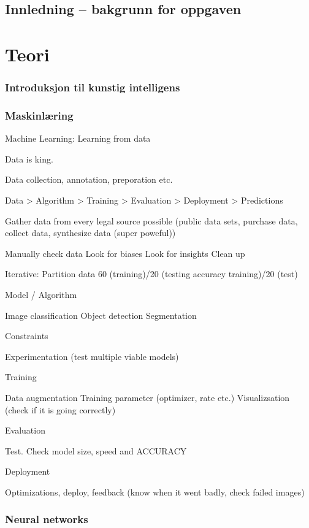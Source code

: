 \subsection{Innledning -- bakgrunn for oppgaven}
\section{Teori}
\subsubsection{Introduksjon til kunstig intelligens}

\subsubsection{Maskinlæring}

Machine Learning: Learning from data

Data is king.

Data collection, annotation, preporation etc.

Data > Algorithm > Training > Evaluation > Deployment > Predictions

	Gather data from every legal source possible (public data sets, purchase data, collect data, synthesize data (super poweful))

	Manually check data
	Look for biases
	Look for insights
	Clean up

	Iterative: Partition data 60 (training)/20 (testing accuracy training)/20 (test)

Model / Algorithm

	Image classification
	Object detection 
	Segmentation

	Constraints

	Experimentation (test multiple viable models)

Training

	Data augmentation
	Training parameter (optimizer, rate etc.)
	Visualizsation (check if it is going correctly)

Evaluation
	
	Test. Check model size, speed and ACCURACY

Deployment

	Optimizations, deploy, feedback (know when it went badly, check failed images)	

\subsubsection{Neural networks}


